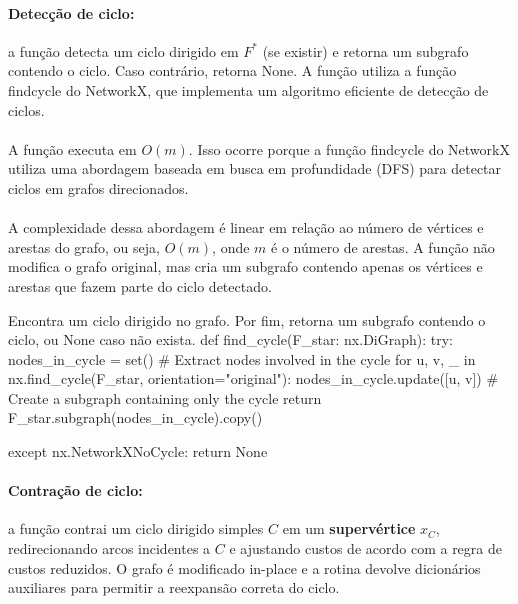 \documentclass[12pt,a4paper]{article}
\def\texttt#1{#1}%
\def\emph#1{#1}%
\def\_{}%
\begin{document}
\paragraph{Detecção de ciclo:}
a função detecta um ciclo dirigido em \(F^*\) (se existir) e retorna um subgrafo contendo o ciclo. Caso contrário, retorna None. A função utiliza a função \texttt{find\_cycle} do NetworkX, que implementa um algoritmo eficiente de detecção de ciclos.

\paragraph{}
A função executa em \(O(m)\). Isso ocorre porque a função \texttt{find\_cycle} do NetworkX utiliza uma abordagem baseada em busca em profundidade (DFS) para detectar ciclos em grafos direcionados.

\paragraph{}
A complexidade dessa abordagem é linear em relação ao número de vértices e arestas do grafo, ou seja, \(O(m)\), onde \(m\) é o número de arestas. A função não modifica o grafo original, mas cria um subgrafo contendo apenas os vértices e arestas que fazem parte do ciclo detectado.

\begin{pybox}[title={Detecção de ciclo dirigido em $F^*$},colback=blue!5!white,colframe=blue!75!black]{Encontra um ciclo dirigido no grafo. Por fim, retorna um subgrafo contendo o ciclo, ou None caso não exista.}
def find_cycle(F_star: nx.DiGraph):
    try:
        nodes_in_cycle = set()
        # Extract nodes involved in the cycle
        for u, v, _ in nx.find_cycle(F_star, orientation="original"):
            nodes_in_cycle.update([u, v])
        # Create a subgraph containing only the cycle
        return F_star.subgraph(nodes_in_cycle).copy()

    except nx.NetworkXNoCycle:
        return None
\end{pybox}

\paragraph{Contração de ciclo:}
a função contrai um ciclo dirigido simples \(C\) em um \textbf{supervértice} \(x_C\), redirecionando arcos incidentes a \(C\) e ajustando custos de acordo com a regra de \emph{custos reduzidos}. O grafo é modificado \emph{in-place} e a rotina devolve dicionários auxiliares para permitir a \emph{reexpansão} correta do ciclo.
\end{document}
